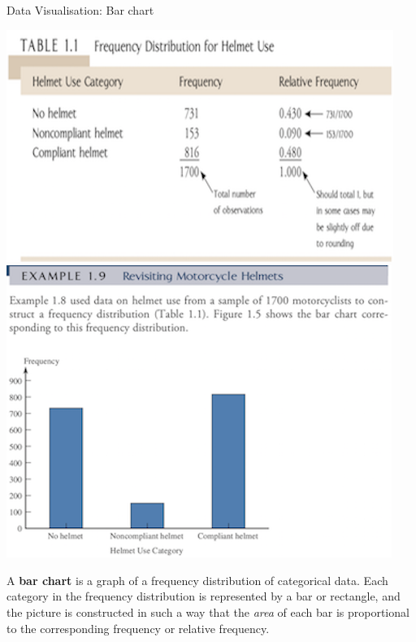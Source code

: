 \documentclass[ignorenonframetext,]{beamer}
\begin{document}
\begin{frame}{Data Visualisation: Bar chart}

\includegraphics{fig1.1.png}\includegraphics{fig1.2.png}

A \textbf{bar chart} is a graph of a frequency distribution of
categorical data. Each category in the frequency distribution is
represented by a bar or rectangle, and the picture is constructed in
such a way that the \emph{area} of each bar is proportional to the
corresponding frequency or relative frequency.

\end{frame}
\end{document}
